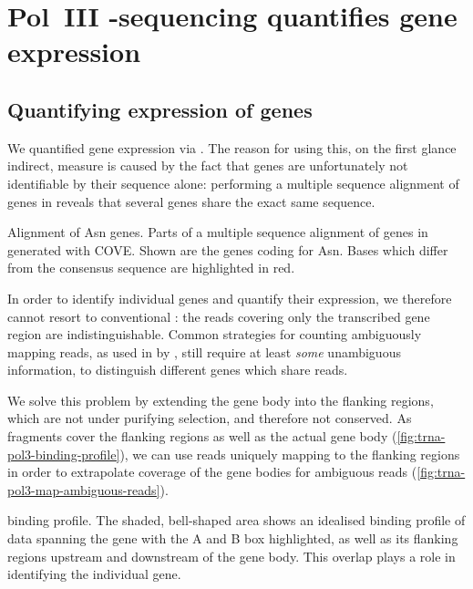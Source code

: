 \chapter{Pol~III -sequencing quantifies  gene
expression}
\label{sec:chip}

\section{Quantifying expression of  genes}

We quantified \trna gene expression via  \chipseq. The reason for using
this, on the first glance indirect, measure is caused by the fact that \trna
genes are unfortunately not identifiable by their sequence alone: performing a
multiple sequence alignment of \trna genes in \mmu reveals that several \trna
genes share the exact same sequence.

    {\footnotesize
    }
    {Alignment of Asn \trna genes.}
    {Parts of a multiple sequence alignment of \trna genes in \mmu generated
    with COVE\@. Shown are the \trna genes coding for Asn. Bases which differ
    from the consensus sequence are highlighted in red.}

In order to identify individual \trna genes and quantify their expression, we
therefore cannot resort to conventional \rnaseq: the \rna reads covering only
the transcribed gene region are indistinguishable. Common strategies for
counting ambiguously mapping reads, as used in  by
\citet{Mortazavi:2008}, still require at least \emph{some} unambiguous
information, to distinguish different genes which share reads.

We solve this problem by extending the \trna gene body into the flanking
regions, which are not under purifying selection, and therefore not conserved.
As  \chipseq fragments cover the flanking regions as well as the actual
gene body (\cref{fig:trna-pol3-binding-profile}), we can use reads uniquely
mapping to the flanking regions in order to extrapolate coverage of the gene
bodies for ambiguous reads (\cref{fig:trna-pol3-map-ambiguous-reads}).

    {\trna {} \chip binding profile.}
    {The shaded, bell-shaped area shows an idealised binding profile of \chipseq
    data spanning the \trna gene with the A and B box highlighted, as well as
    its flanking regions upstream and downstream of the gene body. This overlap
    plays a role in identifying the individual gene.}

